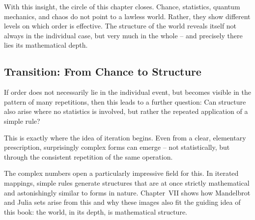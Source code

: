 With this insight, the circle of this chapter closes.
Chance,
statistics,
quantum mechanics,
and chaos do not point to a lawless world.
Rather, they show different levels
on which order is effective.
The structure of the world reveals itself
not always in the individual case,
but very much in the whole --
and precisely there lies its mathematical depth.

\subsection*{Transition: From Chance to Structure}

If order does not necessarily lie in the individual event,
but becomes visible in the pattern of many repetitions,
then this leads to a further question:
Can structure also arise where no statistics is involved,
but rather the repeated application of a simple rule?

This is exactly where the idea of iteration begins.
Even from a clear, elementary prescription,
surprisingly complex forms can emerge --
not statistically,
but through the consistent repetition of the same operation.

The complex numbers open a particularly impressive field for this.
In iterated mappings, simple rules generate
structures
that are at once strictly mathematical
and astonishingly similar to forms in nature.
Chapter~VII shows
how Mandelbrot and Julia sets arise from this
and why these images also fit the guiding idea of this book:
the world, in its depth, is mathematical structure.